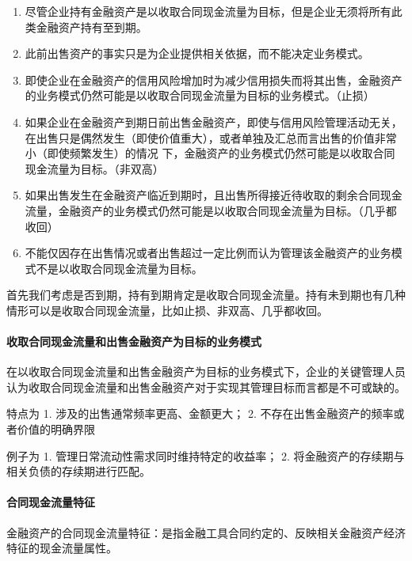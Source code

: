 \documentclass[UTF8,12pt]{ctexart}
\numberwithin{equation}{section} %
\numberwithin{figure}{section}
\numberwithin{table}{section}
\begin{document}
	\begin{enumerate}
		\item 尽管企业持有金融资产是以收取合同现金流量为目标，但是企业无须将所有此类金融资产持有至到期。
		
		\item 此前出售资产的事实只是为企业提供相关依据，而不能决定业务模式。
		
		\item 即使企业在金融资产的信用风险增加时为减少信用损失而将其出售，金融资产的业务模式仍然可能是以收取合同现金流量为目标的业务模式。（止损）
		
		\item 如果企业在金融资产到期日前出售金融资产，即使与信用风险管理活动无关，在出售只是偶然发生（即使价值重大），或者单独及汇总而言出售的价值非常小（即使频繁发生）的情况  下，金融资产的业务模式仍然可能是以收取合同现金流量为目标。（非双高）
		
		\item 如果出售发生在金融资产临近到期时，且出售所得接近待收取的剩余合同现金流量，金融资产的业务模式仍然可能是以收取合同现金流量为目标。（几乎都收回）
		
		\item 不能仅因存在出售情况或者出售超过一定比例而认为管理该金融资产的业务模式不是以收取合同现金流量为目标。
	\end{enumerate}
	
	首先我们考虑是否到期，持有到期肯定是收取合同现金流量。持有未到期也有几种情形可以是收取合同现金流量，比如止损、非双高、几乎都收回。
	
	\paragraph{收取合同现金流量和出售金融资产为目标的业务模式}
	在以收取合同现金流量和出售金融资产为目标的业务模式下，企业的关键管理人员认为收取合同现金流量和出售金融资产对于实现其管理目标而言都是不可或缺的。
	
	特点为
	1.	涉及的出售通常频率更高、金额更大；
	2.	不存在出售金融资产的频率或者价值的明确界限
	
	例子为
	1.	管理日常流动性需求同时维持特定的收益率；
	2.	将金融资产的存续期与相关负债的存续期进行匹配。
	
	\paragraph{合同现金流量特征}
	金融资产的合同现金流量特征：是指金融工具合同约定的、反映相关金融资产经济特征的现金流量属性。
	
\end{document}
